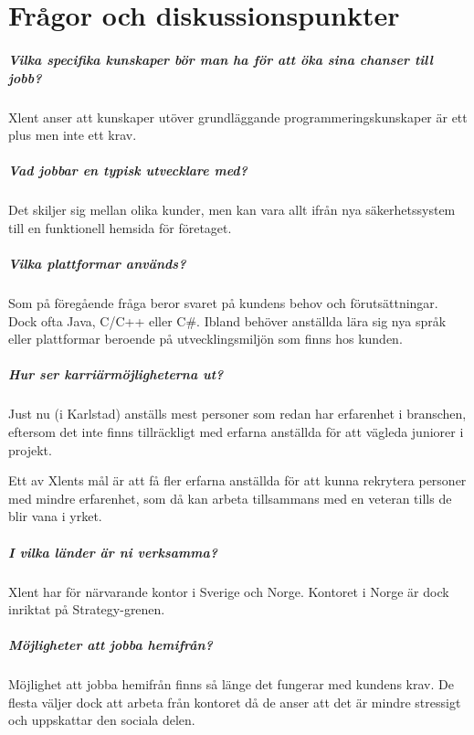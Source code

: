 \documentclass[../report.tex]{subfiles}
\begin{document}
    \chapter{Frågor och diskussionspunkter}
    
    \paragraph{Vilka specifika kunskaper bör man ha för att öka sina chanser till jobb?}
    Xlent anser att kunskaper utöver grundläggande programmeringskunskaper är ett plus men inte ett krav.
    
    \paragraph{Vad jobbar en typisk utvecklare med?}
    Det skiljer sig mellan olika kunder, men kan vara allt ifrån nya säkerhetssystem till en funktionell hemsida för företaget.
    
    \paragraph{Vilka plattformar används?}
    Som på föregående fråga beror svaret på kundens behov och förutsättningar. Dock ofta Java, C/C++ eller C\#. Ibland behöver anställda lära sig nya språk eller plattformar beroende på utvecklingsmiljön som finns hos kunden.
    
    \paragraph{Hur ser karriärmöjligheterna ut?}
    Just nu (i Karlstad) anställs mest personer som redan har erfarenhet i branschen, eftersom det inte finns tillräckligt med erfarna anställda för att vägleda juniorer i projekt.
    
    Ett av Xlents mål är att få fler erfarna anställda för att kunna rekrytera personer med mindre erfarenhet, som då kan arbeta tillsammans med en veteran tills de blir vana i yrket.
    
    \paragraph{I vilka länder är ni verksamma?}
    Xlent har för närvarande kontor i Sverige och Norge. Kontoret i Norge är dock inriktat på Strategy-grenen.
    
    \paragraph{Möjligheter att jobba hemifrån?}
    Möjlighet att jobba hemifrån finns så länge det fungerar med kundens krav. De flesta väljer dock att arbeta från kontoret då de anser att det är mindre stressigt och uppskattar den sociala delen.
    
\end{document}
